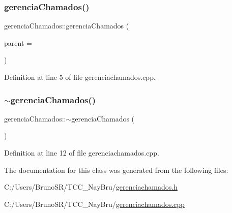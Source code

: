 \subsubsection{\texorpdfstring{gerencia\+Chamados()}{gerenciaChamados()}}
{\footnotesize\ttfamily gerencia\+Chamados\+::gerencia\+Chamados (\begin{DoxyParamCaption}\item[{Q\+Widget $\ast$}]{parent = {} }\end{DoxyParamCaption})\hspace{0.3cm}{\ttfamily [explicit]}}



Definition at line 5 of file gerenciachamados.\+cpp.

\hypertarget{classgerencia_chamados_a393bdaec21bc5e91a03c4d4b02925682}{}\label{classgerencia_chamados_a393bdaec21bc5e91a03c4d4b02925682} 
\subsubsection{\texorpdfstring{$\sim$gerencia\+Chamados()}{~gerenciaChamados()}}
{\footnotesize\ttfamily gerencia\+Chamados\+::$\sim$gerencia\+Chamados (\begin{DoxyParamCaption}{ }\end{DoxyParamCaption})}



Definition at line 12 of file gerenciachamados.\+cpp.



The documentation for this class was generated from the following files\+:\begin{DoxyCompactItemize}
\item 
C\+:/\+Users/\+Bruno\+S\+R/\+T\+C\+C\+\_\+\+Nay\+Bru/\hyperlink{gerenciachamados_8h}{gerenciachamados.\+h}\item 
C\+:/\+Users/\+Bruno\+S\+R/\+T\+C\+C\+\_\+\+Nay\+Bru/\hyperlink{gerenciachamados_8cpp}{gerenciachamados.\+cpp}\end{DoxyCompactItemize}
